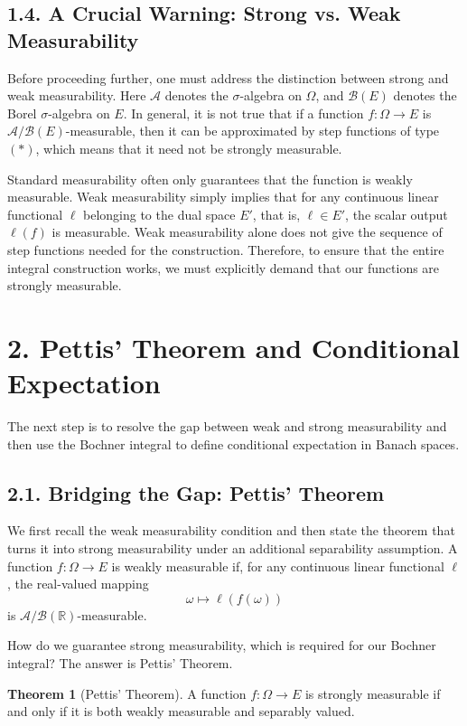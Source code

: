 \documentclass[11pt]{article}
\theoremstyle{definition}
\newtheorem{theorem}{Theorem}
\theoremstyle{remark}
\begin{document}
\subsection*{1.4. A Crucial Warning: Strong vs. Weak Measurability}
Before proceeding further, one must address the distinction between strong and weak measurability. Here \(\mathcal A\) denotes the \(\sigma\)-algebra on \(\Omega\), and \(\mathcal B(E)\) denotes the Borel \(\sigma\)-algebra on \(E\). In general, it is not true that if a function \(f:\Omega\to E\) is \(\mathcal A/\mathcal B(E)\)-measurable, then it can be approximated by step functions of type \((*)\), which means that it need not be strongly measurable.

Standard measurability often only guarantees that the function is weakly measurable. Weak measurability simply implies that for any continuous linear functional \(\ell\) belonging to the dual space \(E'\), that is, \(\ell\in E'\), the scalar output \(\ell(f)\) is measurable. Weak measurability alone does not give the sequence of step functions needed for the construction. Therefore, to ensure that the entire integral construction works, we must explicitly demand that our functions are strongly measurable.

\section*{2. Pettis' Theorem and Conditional Expectation}
The next step is to resolve the gap between weak and strong measurability and then use the Bochner integral to define conditional expectation in Banach spaces.

\subsection*{2.1. Bridging the Gap: Pettis' Theorem}
We first recall the weak measurability condition and then state the theorem that turns it into strong measurability under an additional separability assumption. A function \(f:\Omega\to E\) is weakly measurable if, for any continuous linear functional \(\ell\), the real-valued mapping
\[
\omega\mapsto \ell(f(\omega))
\]
is \(\mathcal A/\mathcal B(\mathbb R)\)-measurable.

How do we guarantee strong measurability, which is required for our Bochner integral? The answer is Pettis' Theorem.

\begin{theorem}[Pettis' Theorem]
A function \(f:\Omega\to E\) is strongly measurable if and only if it is both weakly measurable and separably valued.
\end{theorem}
\end{document}
